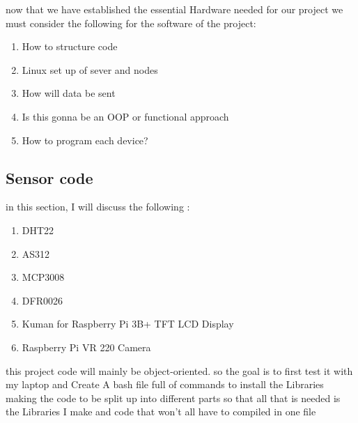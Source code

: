 
	now that we have established the  essential Hardware needed for our project we must consider the following  for the software of the  project:
	\begin{enumerate}
	    \item How to structure code 
	    \item Linux set up of sever and nodes
	    \item How will data be sent
	    \item Is this gonna be an OOP or functional  approach
	    \item How to program each device?
	\end{enumerate}
	\subsection{Sensor code}
	in this section, I will discuss the following :
	\begin{enumerate}
		\item DHT22
		\item AS312
		\item MCP3008
		\item DFR0026
		\item Kuman for Raspberry Pi 3B+ TFT LCD Display
		\item Raspberry Pi VR 220 Camera 
	\end{enumerate}
	this project code will mainly be object-oriented. so the goal is to first test it with my laptop and  Create A bash file  full of  commands to install  the Libraries
	making the code to be split up  into  different parts so that all that is needed is the Libraries I make and code that won't all have to  compiled in one file

